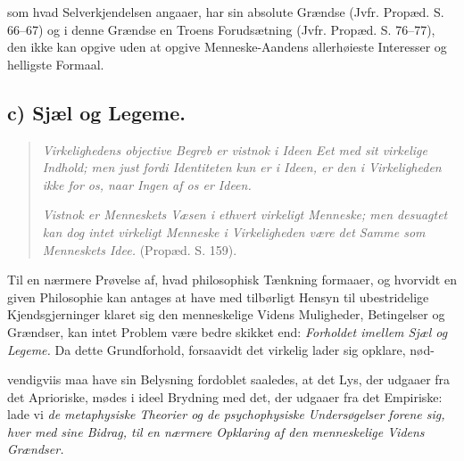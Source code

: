 \documentclass[12pt,a4paper]{book}
\begin{document}
som hvad Selverkjendelsen angaaer, har sin absolute Grændse (Jvfr. Propæd. S.
66--67) og i denne Grændse en Troens Forudsætning (Jvfr. Propæd. S. 76--77),
den ikke kan opgive uden at opgive Menneske-Aandens allerhøieste Interesser og
helligste Formaal.

\subsection*{c) Sjæl og Legeme.}

\begin{quote}
\emph{Virkelighedens objective Begreb er vistnok i Ideen Eet med sit virkelige
Indhold; men just fordi Identiteten kun er i Ideen, er den i Virkeligheden ikke
for os, naar Ingen af os er Ideen.}

\emph{Vistnok er Menneskets Væsen i ethvert virkeligt Menneske; men desuagtet kan
dog intet virkeligt Menneske i Virkeligheden være det Samme som Menneskets Idee.}
(Propæd. S. 159).
\end{quote}

Til en nærmere Prøvelse af, hvad philosophisk Tænkning formaaer, og hvorvidt en
given Philosophie kan antages at have med tilbørligt Hensyn til ubestridelige
Kjendsgjerninger klaret sig den menneskelige Videns Muligheder, Betingelser og
Grændser, kan intet Problem være bedre skikket end: \emph{Forholdet imellem Sjæl
og Legeme.} Da dette Grundforhold, forsaavidt det virkelig lader sig opklare,
nød-

vendigviis maa have sin Belysning fordoblet saaledes, at det Lys, der udgaaer fra
det Aprioriske, mødes i ideel Brydning med det, der udgaaer fra det Empiriske:
lade vi \emph{de metaphysiske Theorier og de psychophysiske Undersøgelser forene
sig, hver med sine Bidrag, til en nærmere Opklaring af den menneskelige Videns
Grændser.}
\end{document}
